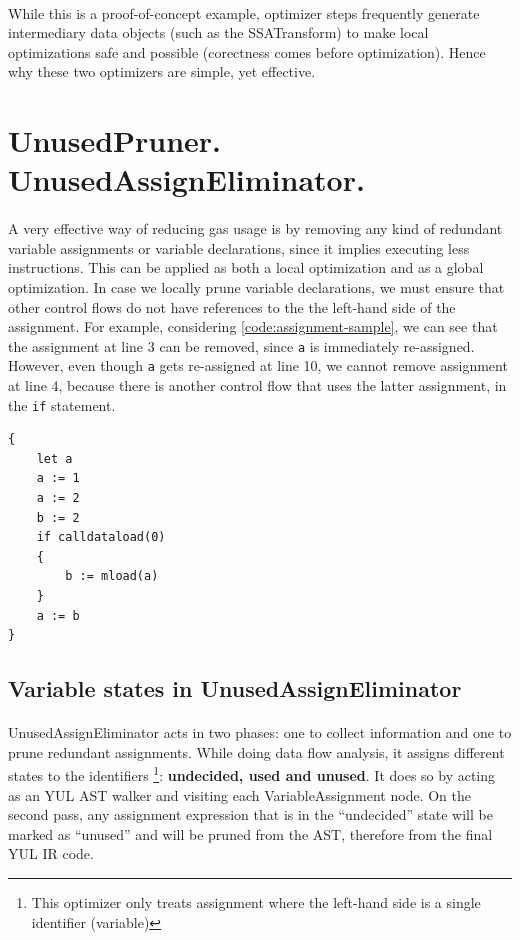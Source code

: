 \paragraph*{}
While this is a proof-of-concept example, optimizer steps frequently generate intermediary data objects (such as the SSATransform) to make local optimizations safe and possible (corectness comes before optimization). Hence why these two optimizers are simple, yet effective.

\section{UnusedPruner. UnusedAssignEliminator.}
\paragraph*{}
A very effective way of reducing gas usage is by removing any kind of redundant variable assignments or variable declarations, since it implies executing less instructions. This can be applied as both a local optimization and as a global optimization. In case we locally prune variable declarations, we must ensure that other control flows do not have references to the the left-hand side of the assignment. For example, considering \ref*{code:assignment-sample}, we can see that the assignment at line 3 can be removed, since \lstinline[columns=fixed]{a} is immediately re-assigned. However, even though \lstinline[columns=fixed]{a} gets re-assigned at line 10, we cannot remove assignment at line 4, because there is another control flow that uses the latter assignment, in the \lstinline[columns=fixed]{if} statement. 

\label{code:assignment-sample}
\begin{lstlisting}[caption=YUL IR code sample for variable assignments. Both variables a and b are used in a different control flow.]
{
    let a
    a := 1
    a := 2
    b := 2
    if calldataload(0)
    {
        b := mload(a)
    }
    a := b
}
\end{lstlisting}

\subsection{Variable states in UnusedAssignEliminator}
\paragraph*{}
UnusedAssignEliminator acts in two phases: one to collect information and one to prune redundant assignments. While doing data flow analysis, it assigns different states to the identifiers \footnote{This optimizer only treats assignment where the left-hand side is a single identifier (variable)}: \textbf{undecided, used and unused}. It does so by acting as an YUL AST walker and visiting each VariableAssignment node. On the second pass, any assignment expression that is in the ``undecided'' state will be marked as ``unused'' and will be pruned from the AST, therefore from the final YUL IR code.

